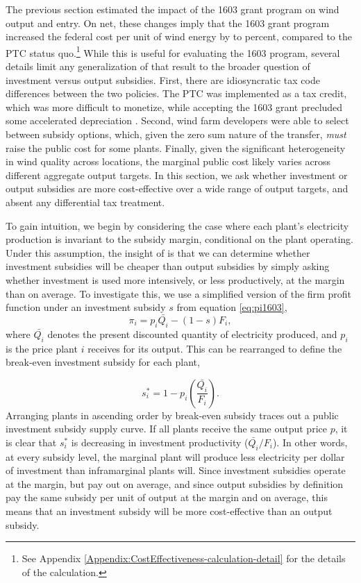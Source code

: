 \documentclass[12pt]{article}
\begin{document}
The previous section estimated the impact of the 1603 grant program on wind output and entry. On net, these changes imply that the 1603 grant program increased the federal cost per unit of wind energy by  \unskip to  \unskip percent, compared to the PTC status quo.\footnote{See Appendix \ref{Appendix:CostEffectiveness-calculation-detail} for the details of the calculation.} While this is useful for evaluating the 1603 program, several details limit any generalization of that result to the broader question of investment versus output subsidies.  First, there are idiosyncratic tax code differences between the two policies. The PTC was implemented as a tax credit, which was more difficult to monetize, while accepting the 1603 grant precluded some accelerated depreciation \citep{johnston_nonrefundable_2019}. Second, wind farm developers were able to select between subsidy options, which, given the zero sum nature of the transfer, \emph{must} raise the public cost for some plants. Finally, given the significant heterogeneity in wind quality across locations, the marginal public cost likely varies across different aggregate output targets. In this section, we ask whether investment or output subsidies are more cost-effective over a wide range of output targets, and absent any differential tax treatment. 

To gain intuition, we begin by considering the case where each plant's electricity production is invariant to the subsidy margin, conditional on the plant operating. Under this assumption, the insight of \citet{parish_relative_1982} is that we can determine whether investment subsidies will be cheaper than output subsidies by simply asking whether investment is used more intensively, or less productively, at the margin than on average. To investigate this, we use a simplified version of the firm profit function under an investment subsidy $s$ from equation \ref{eq:pi1603}, 
\begin{equation*}
\pi_i = p_i \bar{Q_i} - (1-s)F_i ,
\end{equation*}
where $\bar{Q_i}$ denotes the present discounted quantity of electricity produced, and $p_i$ is the price plant $i$ receives for its output. This can be rearranged to define the break-even investment subsidy for each plant,

\begin{equation}
  s^*_i = 1 - p_i \left( \frac{\bar{Q_i}}{F_i} \right) . \label{eq:BE_subsidy}
\end{equation}
Arranging plants in ascending order by break-even subsidy traces out a public investment subsidy supply curve. If all plants receive the same output price $p$, it is clear that $s^*_i$ is decreasing in investment productivity ($\bar{Q_i} / F_i$). In other words, at every subsidy level, the marginal plant will produce less electricity per dollar of investment than inframarginal plants will. Since investment subsidies operate at the margin, but pay out on average, and since output subsidies by definition pay the same subsidy per unit of output at the margin and on average, this means that an investment subsidy will be more cost-effective than an output subsidy. 
\end{document}
